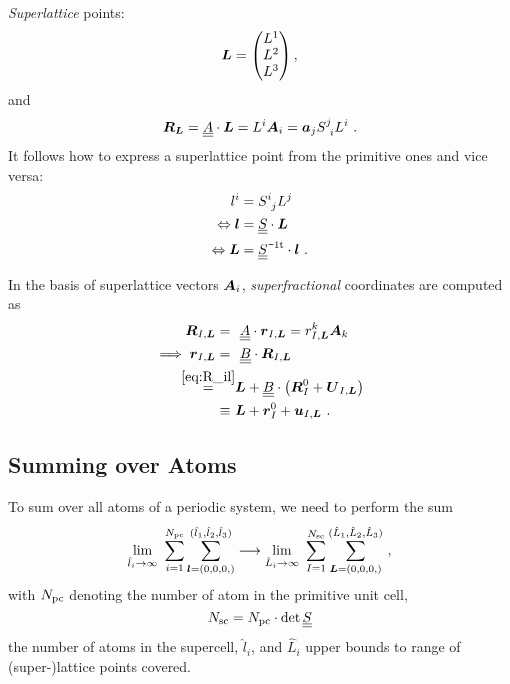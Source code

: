 \emph{Superlattice} points:
\begin{align}
\boldsymbol{L}
= \begin{pmatrix}
L^1 \\ L^2 \\ L^3
\end{pmatrix},
\end{align}
and
\begin{align}
\boldsymbol{R}_{\boldsymbol{L}} = \underline{\underline{{A}}} \cdot \boldsymbol{L} = L^i \boldsymbol{A}_i
= \boldsymbol{a}_j S^j_{~i} L^i~.
\end{align}
It follows how to express a superlattice point from the primitive ones and vice 
versa:
\begin{align}
\begin{split}
	l^i &= S^i_{~j} L^j \\
	\Leftrightarrow \b l &= \uunderline{S} \cdot \b L \\
	\Leftrightarrow \b L &= \itp{\uunderline{S}} \cdot \b l~.
\end{split}
\end{align}

In the basis of superlattice vectors $\boldsymbol{A}_i$, \emph{superfractional} 
coordinates are computed as
\begin{subequations}
	\begin{align}
	\boldsymbol{R}_{I, \boldsymbol{L}} 
	=~& ~ \underline{\underline{{A}}} \cdot \boldsymbol{r}_{I, \boldsymbol{L}} = r_{I, \boldsymbol{L}}^k \boldsymbol{A}_k \\
	\implies \boldsymbol{r}_{I, \boldsymbol{L}} =~& ~\underline{\underline{{B}}} \cdot \boldsymbol{R}_{I, \boldsymbol{L}} \\
	\stackrel{\eqref{eq:R_il}}{=}&
	\boldsymbol{L} + \underline{\underline{{B}}} \cdot \left(\boldsymbol{R}^0_{I} +  \boldsymbol{U}_{I, \boldsymbol{L}}\right) \\
	\equiv~& \boldsymbol{L} + \boldsymbol{r}_I^0 + \boldsymbol{u}_{I, \boldsymbol{L}}~.
	\end{align}
	\label{eq:Rfrac_full}
\end{subequations}


\subsection{Summing over Atoms}
To sum over all atoms of a periodic system, we need to perform the sum
\begin{align}
	\lim\limits_{\hat{l}_i \to \infty}~
	\sum_{i=1}^{N_{\text{pc}}} 
	\sum_{\boldsymbol{l} = (0, 0, 0,)}^{(\hat{l}_1, \hat{l}_2, \hat{l}_3)}
\longrightarrow
\lim\limits_{\hat{L}_i \to \infty}~
	\sum_{I=1}^{N_{\text{sc}}} 
	\sum_{\boldsymbol{L} = (0, 0, 0,)}^{(\hat{L}_1, \hat{L}_2, \hat{L}_3)}~,
	\label{eq:sumlp}
\end{align}
with $N_{\text{pc}}$ denoting the number of atom in the primitive unit cell, 
$$N_{\text{sc}} = N_{\text{pc}} \cdot \det \underline{\underline{{S}}}$$ 
the number of atoms in the supercell, $\hat{l}_i$, and $\hat{L}_i$ upper bounds 
to range of (super-)lattice points covered.

